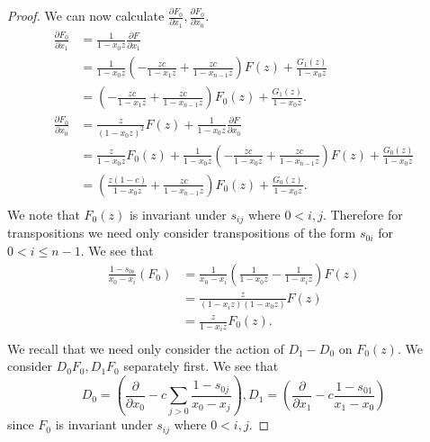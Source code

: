 \documentclass{amsart}
\numberwithin{equation}{section}
\theoremstyle{definition}
\begin{document}
\begin{proof}
We can now calculate $\frac{\partial F_0}{\partial x_1},\frac{\partial F_0}{\partial x_0}$. 
\begin{align*}
\frac{\partial F_0}{\partial x_1}%
&=\frac{1}{1-x_0z}\frac{\partial F}{\partial x_1}\\
&=\frac{1}{1-x_0z}\left(-\frac{zc}{1-x_1z}+\frac{zc}{1-x_{n-1}z}\right)F(z)+\frac{G_1(z)}{1-x_0z}\\
&=\left(-\frac{zc}{1-x_1z}+\frac{zc}{1-x_{n-1}z}\right)F_0(z)+\frac{G_1(z)}{1-x_0z}.\\
\frac{\partial F_0}{\partial x_0}%
&=\frac{z}{(1-x_0z)^2}F(z)+\frac{1}{1-x_0z}\frac{\partial F}{\partial x_0}\\
&=\frac{z}{1-x_0z}F_0(z)+\frac{1}{1-x_0z}\left(-\frac{zc}{1-x_0z}+\frac{zc}{1-x_{n-1}z}\right)F(z)+\frac{G_0(z)}{1-x_0z}\\
&=\left(\frac{z(1-c)}{1-x_0z}+\frac{zc}{1-x_{n-1}z}\right)F_0(z)+\frac{G_0(z)}{1-x_0z}.\\
\end{align*}
We note that $F_0(z)$ is invariant under $s_{ij}$ where $0 < i,j$. Therefore for transpositions we need only consider transpositions of the form $s_{0i}$ for $0 < i \le n-1$. We see that 
\begin{align*}
\frac{1-s_{0i}}{x_0-x_i}(F_0)%
&=\frac{1}{x_0-x_i}\left(\frac{1}{1-x_0z}-\frac{1}{1-x_iz}\right)F(z)\\
&=\frac{z}{(1-x_iz)(1-x_0z)}F(z)\\
&=\frac{z}{1-x_iz}F_0(z).\\
\end{align*}
We recall that we need only consider the action of $D_1-D_0$ on $F_0(z)$. We consider $D_0F_0, D_1F_0$ separately first. We see that $$D_0=\left(\frac{\partial}{\partial x_0}-c\sum_{j > 0} \frac{1-s_{0j}}{x_0-x_j}\right), D_1=\left(\frac{\partial}{\partial x_1}-c \frac{1-s_{01}}{x_1-x_0}\right)$$ since $F_0$ is invariant under $s_{ij}$ where $0 < i,j$. 

\end{proof}
\end{document}
